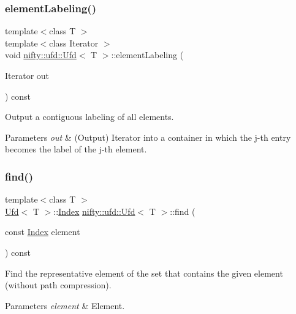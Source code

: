 \subsubsection{\texorpdfstring{element\+Labeling()}{elementLabeling()}}
{\footnotesize\ttfamily template$<$class T $>$ \\
template$<$class Iterator $>$ \\
void \hyperlink{classnifty_1_1ufd_1_1Ufd}{nifty\+::ufd\+::\+Ufd}$<$ T $>$\+::element\+Labeling (\begin{DoxyParamCaption}\item[{Iterator}]{out }\end{DoxyParamCaption}) const\hspace{0.3cm}{\ttfamily [inline]}}

Output a contiguous labeling of all elements.


\begin{DoxyParams}{Parameters}
{\em out} & (Output) Iterator into a container in which the j-\/th entry becomes the label of the j-\/th element. \\
\hline
\end{DoxyParams}
\mbox{\label{classnifty_1_1ufd_1_1Ufd_aa68dd37173ce831b7720ccbb52c2c0a8}} 
\subsubsection{\texorpdfstring{find()}{find()}\hspace{0.1cm}{\footnotesize\ttfamily [1/2]}}
{\footnotesize\ttfamily template$<$class T $>$ \\
\hyperlink{classnifty_1_1ufd_1_1Ufd}{Ufd}$<$ T $>$\+::\hyperlink{classnifty_1_1ufd_1_1Ufd_a0a9a7ab02b6d77fb2035234cbda8b3a7}{Index} \hyperlink{classnifty_1_1ufd_1_1Ufd}{nifty\+::ufd\+::\+Ufd}$<$ T $>$\+::find (\begin{DoxyParamCaption}\item[{const \hyperlink{classnifty_1_1ufd_1_1Ufd_a0a9a7ab02b6d77fb2035234cbda8b3a7}{Index}}]{element }\end{DoxyParamCaption}) const\hspace{0.3cm}{\ttfamily [inline]}}

Find the representative element of the set that contains the given element (without path compression).


\begin{DoxyParams}{Parameters}
{\em element} & Element. \\
\hline
\end{DoxyParams}
\mbox{\label{classnifty_1_1ufd_1_1Ufd_ad8527c71f15c6ecda301cd96fa391f35}} 
